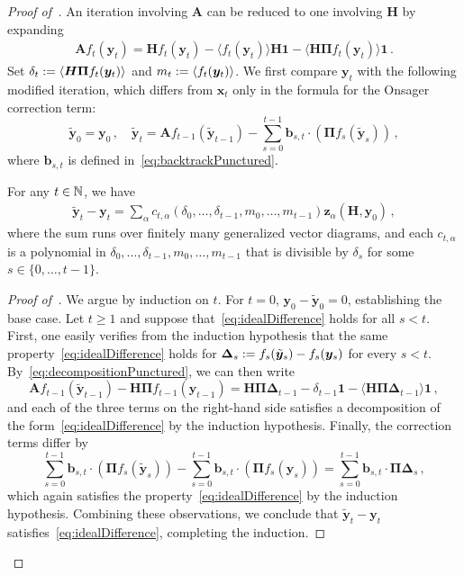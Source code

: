 \begin{proof}[Proof of~]
    An iteration involving $\bm A$ can be reduced to one involving $\bm H$ by expanding
    \begin{align}
        \bm Af_{t}(\bm y_{t}) = \bm H f_{t}(\bm y_{t}) - \langle f_{t}(\bm y_{t})\rangle \bm H \bm 1 - \langle \bm H \bm \Pi f_{t}(\bm y_{t})\rangle \bm 1\,.\label{eq:decompositionPunctured}
    \end{align}
    Set $\delta_t:= \langle \bm H \bm \Pi f_{t}({\bm y}_{t})\rangle$ and $m_t := \langle f_t(\bm y_t)\rangle$. 
    We first compare $\bm y_t$ with the following modified iteration, which differs from $\bm x_t$ only in the formula for the Onsager correction term:
    \[
        \tilde {\bm y}_0 = \bm y_0\,,\quad \tilde {\bm y}_t = \bm A f_{t-1}(\tilde {\bm y}_{t-1}) - \sum_{s=0}^{t-1} {\bm b}_{s,t} \cdot (\bm \Pi f_s(\tilde {\bm y}_s))\,,
    \]
    where $\bm b_{s,t}$ is defined in~\cref{eq:backtrackPunctured}.

    \begin{claim}\label{claim:divisibility}
        For any $t\in \mathbb{N}$, we have
        \begin{align}
            \tilde {\bm y}_t-\bm y_t = \sum_{\alpha} c_{t,\alpha}(\delta_0, \ldots, \delta_{t-1}, m_0, \ldots, m_{t-1}) \bm z_{\alpha}(\bm H, \bm y_0)\,,\label{eq:idealDifference}
        \end{align}
        where the sum runs over finitely
        many generalized vector diagrams, and each $c_{t,\alpha}$ is a polynomial in $\delta_0, \ldots, \delta_{t-1}, m_0, \ldots, m_{t-1}$ that is divisible by $\delta_s$ for some $s \in \{0, \ldots, t-1\}$.
    \end{claim}

    \begin{proof}[Proof of~]
        We argue by induction on $t$.
        For $t=0$, $\bm y_0-\tilde{\bm y}_0=0$, establishing the base case. Let $t\ge 1$ and suppose that~\cref{eq:idealDifference}
        holds for all $s< t$. 
        First, one easily verifies from the induction hypothesis that the same property~\cref{eq:idealDifference} holds for $\bm \Delta_s := f_s(\tilde{\bm y}_s) - f_s(\bm y_s)$ for every $s < t$.
        By~\cref{eq:decompositionPunctured}, we can then write
        \[
            \bm A f_{t-1}(\tilde {\bm y}_{t-1}) - \bm H \bm \Pi f_{t-1}(\bm y_{t-1}) = \bm H \bm \Pi \bm \Delta_{t-1} - \delta_{t-1} \bm 1 - \langle \bm H \bm \Pi \bm \Delta_{t-1}\rangle \bm 1\,,
        \]
        and each of the three terms on the right-hand side satisfies a decomposition of the form~\cref{eq:idealDifference} by the induction hypothesis.
        Finally,  the correction terms differ by
        \[
            \sum_{s=0}^{t-1} \bm b_{s,t} \cdot (\bm \Pi f_s(\tilde {\bm y}_s)) - \sum_{s=0}^{t-1} \bm b_{s,t} \cdot (\bm \Pi f_s({\bm y}_s)) = \sum_{s=0}^{t-1} \bm b_{s,t} \cdot \bm \Pi \bm \Delta_s\,,
        \]
        which again satisfies the property~\cref{eq:idealDifference} by the induction hypothesis. Combining these observations, we conclude that $\tilde{\bm y}_t-\bm y_t$ satisfies~\cref{eq:idealDifference}, completing the induction.
    \end{proof}


\end{proof}
